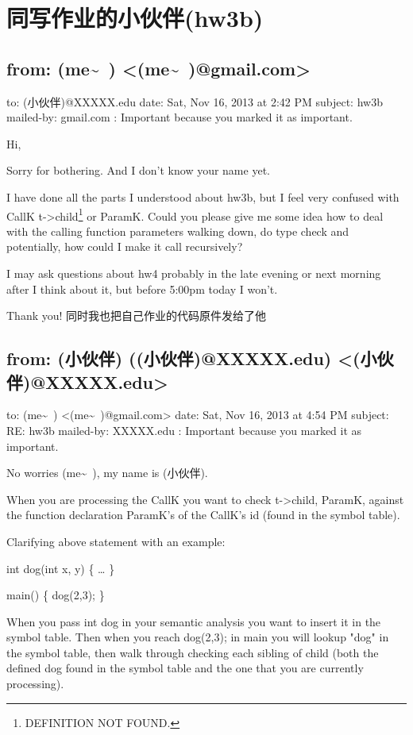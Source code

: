 \documentclass[12pt]{book}
\begin{document}
\chapter{同写作业的小伙伴(hw3b)}
\label{sec-38}

\section{from:         (me\textasciitilde{}~) <(me\textasciitilde{}~)@gmail.com>}
\label{sec-38-1}
to:         (小伙伴)@XXXXX.edu
date:         Sat, Nov 16, 2013 at 2:42 PM
subject:         hw3b
mailed-by:         gmail.com
:         Important because you marked it as important.

Hi, 

Sorry for bothering. And I don't know your name yet. 

I have done all the parts I understood about hw3b, but I feel very confused with CallK t->child\footnote{DEFINITION NOT FOUND.} or ParamK. Could you please give me some idea how to deal with the calling function parameters walking down, do type check and potentially, how could I make it call recursively?

I may ask questions about hw4 probably in the late evening or next morning after I think about it, but before 5:00pm today I won't. 

Thank you!
同时我也把自己作业的代码原件发给了他

\section{from:         (小伙伴) ((小伙伴)@XXXXX.edu) <(小伙伴)@XXXXX.edu>}
\label{sec-38-2}
to:         (me\textasciitilde{}~) <(me\textasciitilde{}~)@gmail.com>
date:         Sat, Nov 16, 2013 at 4:54 PM
subject:         RE: hw3b
mailed-by:         XXXXX.edu
:         Important because you marked it as important.

No worries (me\textasciitilde{}~), my name is (小伙伴).

When you are processing the CallK you want to check t->child\footnotemark[2]{}, ParamK, against the function declaration ParamK's of the CallK's id (found in the symbol table).

Clarifying above statement with an example:

int dog(int x, y) \{
\ldots{}
\}

main() \{
dog(2,3);
\}

When you pass int dog in your semantic analysis you want to insert it in the symbol table.
Then when you reach dog(2,3); in main you will lookup "dog" in the symbol table, then walk through checking each sibling of child\footnotemark[2]{} (both the defined dog found in the symbol table and the one that you are currently processing).
\end{document}
